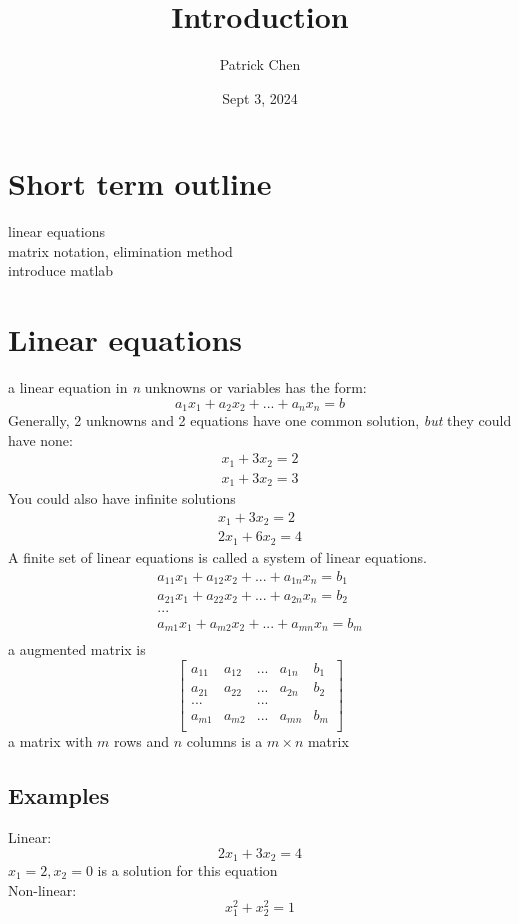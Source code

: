 \documentclass{article}
\title{Introduction}
\author{Patrick Chen}
\date{Sept 3, 2024}
\theoremstyle{mytheoremstyle}
\theoremstyle{mytheoremstyle}
\theoremstyle{myproblemstyle}
\begin{document}
    \maketitle
    \section*{Short term outline}
    linear equations\\
    matrix notation, elimination method\\
    introduce matlab

    \section*{Linear equations}
    a linear equation in \textit{n} unknowns or variables has the form:
    \begin{equation*}
        a_1x_1+a_2x_2+...+a_nx_n=b
    \end{equation*}
    Generally, 2 unknowns and 2 equations have one common solution, \textit{but} they could have none:
    \begin{align*}
        x_1+3x_2=2\\
        x_1+3x_2=3
    \end{align*}
    You could also have infinite solutions
    \begin{align*}
        x_1+3x_2=2\\
        2x_1+6x_2=4
    \end{align*}
    A finite set of linear equations is called a system of linear equations.
    \begin{align*}
        a_{11}x_1+a_{12}x_2+...+a_{1n}x_n=b_1\\
        a_{21}x_1+a_{22}x_2+...+a_{2n}x_n=b_2\\
        ...\\
        a_{m1}x_1+a_{m2}x_2+...+a_{mn}x_n=b_m\\
    \end{align*}
    a augmented matrix is\\
    \begin{equation*}
        \begin{bmatrix}
            a_{11} & a_{12} & ... & a_{1n} & b_1\\
            a_{21} & a_{22} & ... & a_{2n} & b_2\\
            ... &  & ... & & \\
            a_{m1} & a_{m2} & ... & a_{mn} & b_m\\
        \end{bmatrix}
    \end{equation*}
    a matrix with $m$ rows and $n$ columns is a $m\times n$ matrix

    \subsection*{Examples}
    Linear:
    \begin{equation*}
        2x_1+3x_2=4
    \end{equation*}
    $x_1=2, x_2=0$ is a solution for this equation\\
    Non-linear:
    \begin{equation*}
        x_1^2+x_2^2=1
    \end{equation*}
\end{document}

